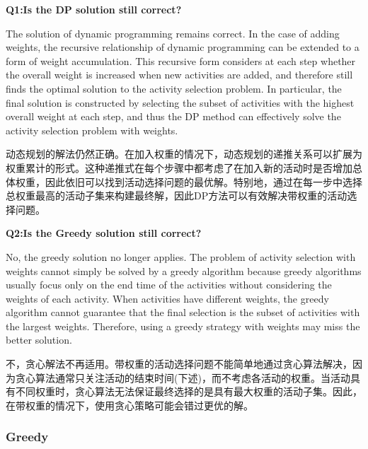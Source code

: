 \documentclass{article}
\begin{document}
\textbf{Q1:Is the DP solution still correct?}\par
The solution of dynamic programming remains correct. In the case of adding weights, the recursive relationship of dynamic programming can be extended to a form of weight accumulation. This recursive form considers at each step whether the overall weight is increased when new activities are added, and therefore still finds the optimal solution to the activity selection problem. In particular, the final solution is constructed by selecting the subset of activities with the highest overall weight at each step, and thus the DP method can effectively solve the activity selection problem with weights.\par
动态规划的解法仍然正确。在加入权重的情况下，动态规划的递推关系可以扩展为权重累计的形式。这种递推式在每个步骤中都考虑了在加入新的活动时是否增加总体权重，因此依旧可以找到活动选择问题的最优解。特别地，通过在每一步中选择总权重最高的活动子集来构建最终解，因此DP方法可以有效解决带权重的活动选择问题。\par
\textbf{Q2:Is the Greedy solution still correct?}\par
No, the greedy solution no longer applies. The problem of activity selection with weights cannot simply be solved by a greedy algorithm because greedy algorithms usually focus only on the end time of the activities without considering the weights of each activity. When activities have different weights, the greedy algorithm cannot guarantee that the final selection is the subset of activities with the largest weights. Therefore, using a greedy strategy with weights may miss the better solution.\par
不，贪心解法不再适用。带权重的活动选择问题不能简单地通过贪心算法解决，因为贪心算法通常只关注活动的结束时间(下述)，而不考虑各活动的权重。当活动具有不同权重时，贪心算法无法保证最终选择的是具有最大权重的活动子集。因此，在带权重的情况下，使用贪心策略可能会错过更优的解。

\subsubsection{Greedy}
\end{document}
